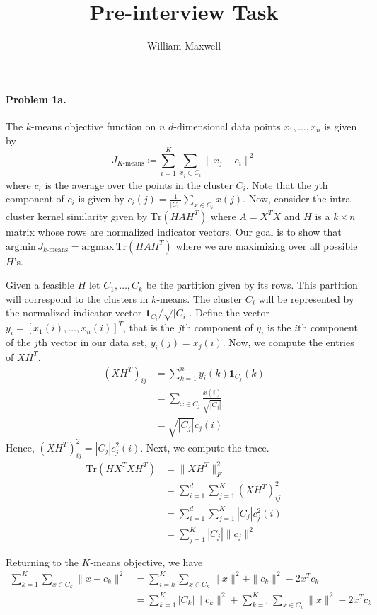 \documentclass[12pt]{article}
\newcommand{\Tr}{\mathrm{Tr}}
\newcommand{\one}{\mathbf{1}}
\begin{document}
\title{Pre-interview Task}
\author{William Maxwell} 
\maketitle
\paragraph{Problem 1a.}
The $k$-means objective function on $n$ $d$-dimensional data points $x_1,\dots,x_n$ is given by \[J_{K\text{-means}} \coloneqq \sum_{i=1}^K \sum_{x_j \in C_i} \|x_j - c_i\|^2 \] where $c_i$ is the average over the points in the cluster $C_i$. Note that the $j$th component of $c_i$ is given by $c_i(j) = \frac{1}{|C_i|}\sum_{x \in C_i} x(j)$.
Now, consider the intra-cluster kernel similarity given by $\Tr(HAH^T)$ where $A = X^TX$ and $H$ is a $k \times n$ matrix whose rows are normalized indicator vectors. Our goal is to show that $\mathrm{argmin} \, J_{k\text{-means}} = \mathrm{argmax} \, \Tr(HAH^T)$ where we are maximizing over all possible $H$'s.

Given a feasible $H$ let $C_1,\dots,C_k$ be the partition given by its rows. This partition will correspond to the clusters in $k$-means. The cluster $C_i$ will be represented by the normalized indicator vector $\one_{C_i} / \sqrt{|C_i|}$.
Define the vector $y_i = [x_1(i),\dots,x_n(i)]^T$, that is the $j$th component of $y_i$ is the $i$th component of the $j$th vector in our data set, $y_i(j) = x_j(i)$. Now, we compute the entries of $XH^T$.
\begin{align*}
(XH^T)_{ij} &= \sum_{k=1}^n y_i(k) \one_{C_j}(k)\\
&= \sum_{x \in C_j} \frac{x(i)}{\sqrt{|C_j|}} \\
&= \sqrt{|C_j|} c_j(i)
\end{align*}
Hence, $(XH^T)_{ij}^2 = |C_j|c_j^2(i)$. Next, we compute the trace.
\begin{align*}
\Tr(HX^TXH^T) &= \|XH^T\|^2_F \\
&= \sum_{i=1}^d \sum_{j=1}^K \left( X H^T \right)^2_{ij} \\
&= \sum_{i=1}^d \sum_{j=1}^K |C_j| c_j^2(i) \\
&= \sum_{j=1}^K |C_j| \|c_j\|^2
\end{align*}

Returning to the $K$-means objective, we have
\begin{align*}
\sum_{k=1}^K \sum_{x \in C_k} \|x - c_k\|^2 &= \sum_{i=k}^K \sum_{x \in C_k} \|x\|^2 + \|c_k\|^2 - 2x^Tc_k \\
&= \sum_{k=1}^K |C_k|\|c_k\|^2 + \sum_{k=1}^K \sum_{x \in C_k} \|x\|^2 - 2x^T c_k
\end{align*}
\end{document}

